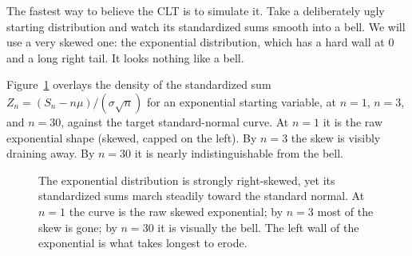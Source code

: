 The fastest way to believe the CLT is to simulate it. Take a deliberately ugly starting
distribution and watch its standardized sums smooth into a bell. We will use a very
skewed one: the exponential distribution, which has a hard wall at $0$ and a long right
tail. It looks nothing like a bell.

Figure~\ref{ch21:fig-converge} overlays the density of the standardized sum
$Z_n = (S_n - n\mu)/(\sigma\sqrt n)$ for an exponential starting variable, at $n=1$,
$n=3$, and $n=30$, against the target standard-normal curve. At $n=1$ it is the raw
exponential shape (skewed, capped on the left). By $n=3$ the skew is visibly draining
away. By $n=30$ it is nearly indistinguishable from the bell.

\begin{figure}[H]
\centering
{}
\caption{The exponential distribution is strongly right-skewed, yet its standardized
sums march steadily toward the standard normal. At $n=1$ the curve is the raw skewed
exponential; by $n=3$ most of the skew is gone; by $n=30$ it is visually the bell. The
left wall of the exponential is what takes longest to erode.}
\label{ch21:fig-converge}
\end{figure}

